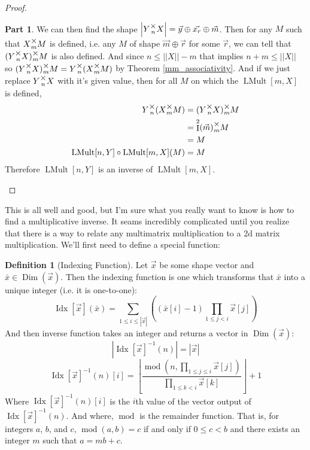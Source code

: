 \documentclass[12pt]{book}
\theoremstyle{plain}
\theoremstyle{definition}
\newtheorem{definition}{Definition}[chapter]
\theoremstyle{ppart}
\newtheorem{ppart}{Part}
\theoremstyle{case}
\theoremstyle{solution}
\DeclareMathOperator{\Dim}{Dim}
\DeclareMathOperator{\Ident}{I}
\DeclareMathOperator{\remainder}{mod}
\DeclareMathOperator{\LMult}{LMult}
\DeclareMathOperator{\Idx}{Idx}
\newcommand{\mmult}[1]{\text{\raisebox{1ex}{$\underset{#1}{\times}$}}}
\newcommand{\shape}[1]{\left|#1\right|}
\begin{document}
\begin{proof}
\begin{ppart}
We can then find the shape $\shape{Y \mmult{n} X} = \vec{y} \oplus \vec{x_r} \oplus \vec{m}$.
Then for any $M$ such that $X \mmult{m} M$ is defined, i.e. any $M$ of shape $\vec{m} \oplus \vec{r}$ for some $\vec{r}$,
we can tell that $(Y \mmult{n} X) \mmult{m} M$ is also defined.
And since $n \le \shape{\shape{X}}-m$ that implies $n+m \le \shape{\shape{X}}$ so $(Y \mmult{n} X) \mmult{m} M = Y \mmult{n} (X \mmult{m} M)$
by Theorem \ref{mm_associativity}.
And if we just replace $Y \mmult{n} X$ with it's given value, then for all $M$ on which the $\LMult[m,X]$ is defined,
\begin{align*}
  Y \mmult{n} (X \mmult{m} M) &= (Y \mmult{n} X) \mmult{m} M  \\
  &= \Ident^2(\vec{m}) \mmult{m} M\\
  &= M \\
  \LMult[n,Y] \circ \LMult[m,X](M) &= M
\end{align*}
Therefore $\LMult[n,Y]$ is an inverse of $\LMult[m,X]$.
\end{ppart}
\end{proof}
 
This is all well and good, but I'm sure what you really want to know is how to find a multiplicative inverse.
It seams incredibly complicated until you realize that there is a way to relate any multimatrix multiplication
to a 2d matrix multiplication. We'll first need to define a special function:

\begin{definition}[Indexing Function]
Let $\vec{x}$ be some shape vector and $\bar{x} \in \Dim(\vec{x})$. Then the indexing function is one which transforms
that $\bar{x}$ into a unique integer (i.e. it is one-to-one):
\[
  \Idx[\vec{x}](\bar{x}) = \sum_{1 \le i \le \shape{\vec{x}}} \left( (\bar{x}[i]-1) \prod_{1 \le j < i} \vec{x}[j] \right)
\]
And then inverse function takes an integer and returns a vector in $\Dim(\vec{x})$:
\[ \shape{\Idx[\vec{x}]^{-1}(n)} = \shape{\vec{x}} \]
\[
  \Idx[\vec{x}]^{-1}(n)[i] =
    \left\lfloor
      \frac{\remainder\left(n, \prod_{1 \le j \le i} \vec{x}[j]\right)}
      {\prod_{1 \le k < i} \vec{x}[k]}
    \right\rfloor + 1
\]
Where $\Idx[\vec{x}]^{-1}(n)[i]$ is the $i$th value of the vector output of $\Idx[\vec{x}]^{-1}(n)$.
And where, $\remainder$ is the remainder function.
That is, for integers $a$, $b$, and $c$, $\remainder(a,b) = c$ if and only if $0 \le c < b$
and there exists an integer $m$ such that $a = mb + c$.
\end{definition}
\end{document}
